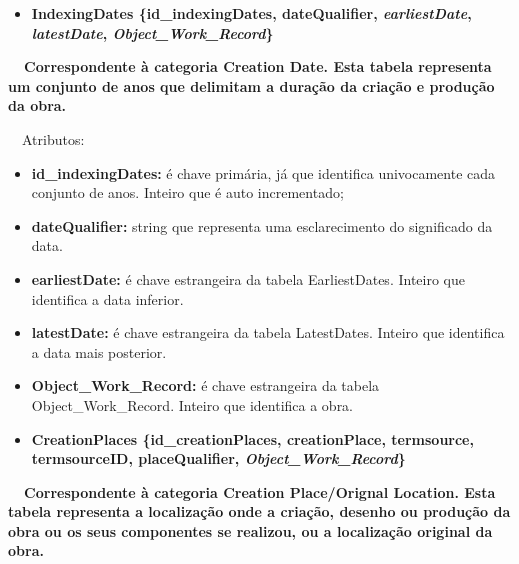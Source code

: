 \documentclass[letterpaper]{article}
\newcommand\textstyleStrongEmphasis[1]{\textbf{#1}}
\newcommand\liststyleLi{%
\renewcommand\labelitemi{{\textbullet}}
\renewcommand\labelitemii{[27A2?]}
\renewcommand\labelitemiii{{\textbullet}}
\renewcommand\labelitemiv{{\textbullet}}
}
\newcommand\liststyleLvi{%
\renewcommand\labelitemi{[27A2?]}
\renewcommand\labelitemii{[27A2?]}
\renewcommand\labelitemiii{[27A2?]}
\renewcommand\labelitemiv{[27A2?]}
}
\begin{document}
\bigskip

\liststyleLi
\begin{itemize}
\item {\bfseries
IndexingDates\textmd{ \{}\textmd{id\_indexingDates}\textmd{,
dateQualifier, }\textmd{\textit{earliestDate}}\textmd{,
}\textmd{\textit{latestDate}}\textmd{,
}\textmd{\textit{Object\_Work\_Record}}\textmd{\}}}
\end{itemize}
{\bfseries
\foreignlanguage{english}{\textmd{\ \ Correspondente \`a categoria
}}\textstyleStrongEmphasis{\foreignlanguage{english}{Creation
Date}}\foreignlanguage{english}{\textmd{. Esta
}}\textstyleStrongEmphasis{\foreignlanguage{english}{\textmd{tabela}}}\foreignlanguage{english}{\textmd{
representa um conjunto de anos que delimitam a dura\c{c}\~ao da
cria\c{c}\~ao e produ\c{c}\~ao da obra.}}}


\bigskip

{
\ \ Atributos:}

\liststyleLvi
\begin{itemize}
\item {
\textbf{id\_}\textbf{indexingDates}\textbf{:} \'e chave prim\'aria, j\'a
que identifica univocamente cada conjunto de anos. Inteiro que \'e auto
incrementado;}
\item {
\textbf{dateQualifier:} string que representa uma esclarecimento do
significado da data.}
\item {
\textbf{earliestDate:} \'e chave estrangeira da tabela EarliestDates.
Inteiro que identifica a data inferior.}
\item {
\textbf{latestDate:} \'e chave estrangeira da tabela LatestDates.
Inteiro que identifica a data mais posterior.}
\item {
\textbf{Object\_Work\_Record:}\textit{ }\'e chave estrangeira da tabela
Object\_Work\_Record. Inteiro que identifica a obra.}
\end{itemize}

\bigskip

\liststyleLi
\begin{itemize}
\item {\bfseries
CreationPlaces\textmd{ \{}\textmd{id\_creationPlaces}\textmd{,
creationPlace, termsource, termsourceID, placeQualifier,
}\textmd{\textit{Object\_Work\_Record}}\textmd{\}}}
\end{itemize}
{\bfseries
\foreignlanguage{english}{\textmd{\ \ Correspondente \`a categoria
}}\foreignlanguage{english}{Creation
Place}\textstyleStrongEmphasis{\foreignlanguage{english}{/Orignal
Location}}\foreignlanguage{english}{\textmd{. Esta
}}\textstyleStrongEmphasis{\foreignlanguage{english}{\textmd{tabela}}}\foreignlanguage{english}{\textmd{
representa a localiza\c{c}\~ao onde a cria\c{c}\~ao, desenho ou
produ\c{c}\~ao da obra ou os seus componentes se realizou, ou a
localiza\c{c}\~ao original da obra.}}}
\end{document}
